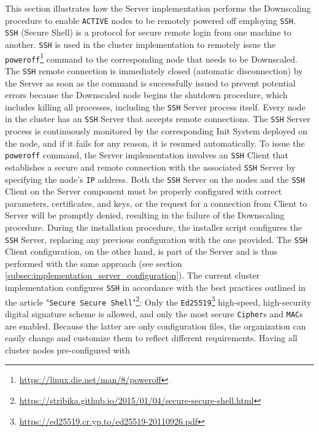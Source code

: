 This section illustrates how the Server implementation performs the Downscaling
procedure to enable \texttt{ACTIVE} nodes to be remotely powered off employing \texttt{SSH}.
\\ %
\texttt{SSH} (Secure Shell) is a protocol for secure remote login from one machine
to another. \texttt{SSH} is used in the cluster implementation to remotely issue
the \texttt{poweroff}\footnote{\url{https://linux.die.net/man/8/poweroff}}
command to the corresponding node that needs to be Downscaled. The \texttt{SSH}
remote connection is immediately closed (automatic disconnection) by the Server
as soon as the command is successfully issued to prevent potential errors
because the Downscaled node begins the shutdown procedure, which includes killing
all processes, including the \texttt{SSH} Server process itself. Every node in
the cluster has an \texttt{SSH} Server that accepts remote connections. The
\texttt{SSH} Server process is continuously monitored by the corresponding Init System
deployed on the node, and if it fails for any reason, it is resumed automatically.
To issue the \texttt{poweroff} command, the Server implementation involves an
\texttt{SSH} Client that establishes a secure and remote connection with the associated
\texttt{SSH} Server by specifying the node's \texttt{IP} address. Both the
\texttt{SSH} Server on the nodes and the \texttt{SSH} Client on the Server
component must be properly configured with correct parameters, certificates, and
keys, or the request for a connection from Client to Server will be promptly denied,
resulting in the failure of the Downscaling procedure. During the installation procedure,
the installer script configures the \texttt{SSH} Server, replacing any previous
configuration with the one provided. The \texttt{SSH} Client configuration, on the
other hand, is part of the Server and is thus performed with the same approach (see
section \ref{subsec:implementation_server_configuration}). The current cluster implementation
configures \texttt{SSH} in accordance with the best practices outlined in the
article "\texttt{Secure Secure Shell}"\footnote{\url{https://stribika.github.io/2015/01/04/secure-secure-shell.html}}:
Only the \texttt{Ed25519}\footnote{\url{https://ed25519.cr.yp.to/ed25519-20110926.pdf}}
high-speed, high-security digital signature scheme is allowed, and only the most
secure \texttt{Cipher}s and \texttt{MAC}s are enabled. Because the latter are
only configuration files, the organization can easily change and customize them to
reflect different requirements. Having all cluster nodes pre-configured with
